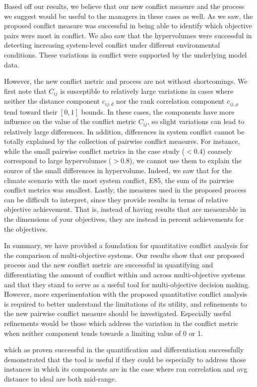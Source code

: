 Based off our results, we believe that our new conflict measure and the process we suggest would be useful to the managers in these cases as well. As we saw, the proposed conflict measure was successful in being able to identify which objective pairs were most in conflict. We also saw that the hypervolumes were successful in detecting increasing system-level conflict under different environmental conditions. These variations in conflict were supported by the underlying model data. 

However, the new conflict metric and process are not without shortcomings. We first note that $C_{ij}$ is susceptible to relatively large variations in cases where neither the distance component $c_{ij,d}$ nor the rank correlation component $c_{ij,\rho}$ tend toward their $[0,1]$ bounds. In these cases, the components have more influence on the value of the conflict metric $C_{ij}$, so slight variations can lead to relatively large differences. In addition, differences in system conflict cannot be totally explained by the collection of pairwise conflict measures. For instance, while the small pairwise conflict metrics in the case study ($< 0.4$) coarsely correspond to large hypervolumes ($> 0.8$), we cannot use them to explain the source of the small differences in hypervolume. Indeed, we saw that for the climate scenario with the most system conflict, E85, the sum of its pairwise conflict metrics was smallest. Lastly, the measures used in the proposed process can be difficult to interpret, since they provide results in terms of relative objective achievement. That is, instead of having results that are measurable in the dimensions of your objectives, they are instead in percent achievements for the objectives.

In summary, we have provided a foundation for quantitative conflict analysis for the comparison of multi-objective systems. Our results show that our proposed process and the new conflict metric are successful in quantifying and differentiating the amount of conflict within and across multi-objective
systems and that they stand to serve as a useful tool for multi-objective decision making. However, more experimentation with the proposed quantitative conflict analysis is required to better understand the limitations of its utility, and refinements to the new pairwise conflict measure should be investigated. Especially useful refinements would be those which address the variation in the conflict metric when neither component tends towards a limiting value of 0 or 1.

which as proven successful in the quantification and differentiation successfully demonstrated that the tool is  useful if they could be especially to address those instances in which its components are in the case where ran correlation and avg distance to ideal are both mid-range.